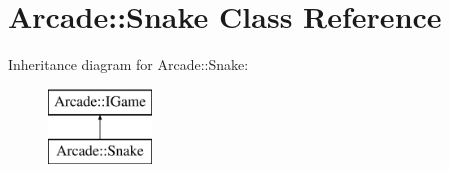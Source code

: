 \hypertarget{class_arcade_1_1_snake}{}\section{Arcade\+:\+:Snake Class Reference}
\label{class_arcade_1_1_snake}
Inheritance diagram for Arcade\+:\+:Snake\+:\begin{figure}[H]
\begin{center}
\leavevmode
\includegraphics[height=2.000000cm]{class_arcade_1_1_snake}
\end{center}
\end{figure}
